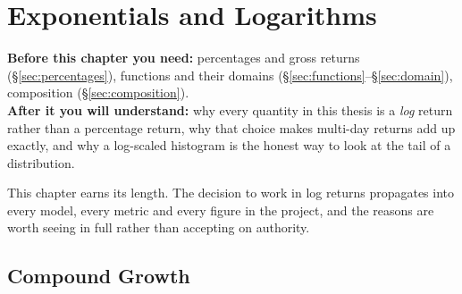 \chapter{Exponentials and Logarithms}
\label{ch:explog}

\begin{tcolorbox}[feynbox={Sky}{BBg},title={Before and After}]
\textbf{Before this chapter you need:} percentages and gross returns
(\S\ref{sec:percentages}), functions and their domains
(\S\ref{sec:functions}--\S\ref{sec:domain}), composition
(\S\ref{sec:composition}).\\
\textbf{After it you will understand:} why every quantity in this thesis is a
\emph{log} return rather than a percentage return, why that choice makes
multi-day returns add up exactly, and why a log-scaled histogram is the honest
way to look at the tail of a distribution.
\end{tcolorbox}

This chapter earns its length. The decision to work in log returns propagates
into every model, every metric and every figure in the project, and the reasons
are worth seeing in full rather than accepting on authority.

\section{Compound Growth}
\label{sec:compound}



